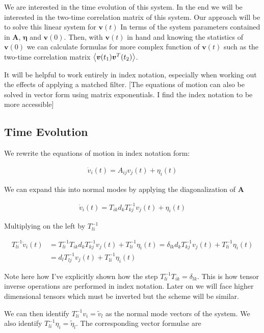 \documentclass[12pt]{article}
\newcommand{\bv}[1]{\boldsymbol{#1}}
\begin{document}
We are interested in the time evolution of this system. In the end we will be interested in the two-time correlation matrix of this system. Our approach will be to solve this linear system for $\bv{v}(t)$ In terms of the system parameters contained in $\bv{A}$, $\bv{\eta}$ and $\bv{v}(0)$. Then, with $\bv{v}(t)$ in hand and knowing the statistics of $\bv{v}(0)$ we can calculate formulas for more complex function of $\bv{v}(t)$ such as the two-time correlation matrix $\Braket{\bv{v}(t_1)\bv{v}^T(t_2)}$.

It will be helpful to work entirely in index notation, especially when working out the effects of applying a matched filter. [The equations of motion can also be solved in vector form using matrix exponentials. I find the index notation to be more accessible]

\subsection{Time Evolution}
We rewrite the equations of motion in index notation form:

\begin{align}
\dot{v}_i(t) = A_{ij}v_j(t) + \eta_i(t)
\end{align}

We can expand this into normal modes by applying the diagonalization of $\bv{A}$

\begin{align}
\dot{v}_i(t) = T_{ik}d_k T^{-1}_{kj} v_j(t) + \eta_i(t)
\end{align}

Multiplying on the left by $T^{-1}_{li}$

\begin{align}
T^{-1}_{li} \dot{v}_i(t) &= T^{-1}_{li}T_{ik} d_k T^{-1}_{kj} v_j(t) + T^{-1}_{li}\eta_i(t) = \delta_{lk} d_k T^{-1}_{kj} v_j(t) + T^{-1}_{li}\eta_i(t)\\
&= d_l T^{-1}_{lj}v_j(t) + T^{-1}_{li}\eta_i(t)
\end{align}

Note here how I've explicitly shown how the step $T^{-1}_{li}T_{ik} = \delta_{lk}$. This is how tensor inverse operations are performed in index notation. Later on we will face higher dimensional tensors which must be inverted but the scheme will be similar.

We can then identify $T^{-1}_{li}v_i = \tilde{v}_l$ as the normal mode vectors of the system. We also identify $T^{-1}_{li}\eta_{i} = \tilde{\eta}_l$. The corresponding vector formulae are
\end{document}
